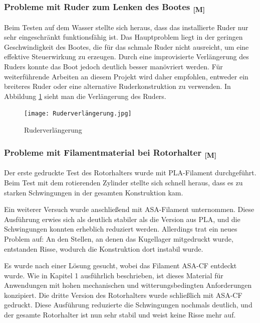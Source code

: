 \documentclass[a4paper,12pt]{article}
\begin{document}
\subsubsection{\texorpdfstring{Probleme mit Ruder zum Lenken des Bootes \textsubscript{[M]}}{Probleme mit Ruder zum Lenken des Bootes [M]}}

Beim Testen auf dem Wasser stellte sich heraus, dass das installierte Ruder nur sehr eingeschränkt funktionsfähig ist. Das Hauptproblem liegt in der geringen Geschwindigkeit des Bootes, die für das schmale Ruder nicht ausreicht, um eine effektive Steuerwirkung zu erzeugen. Durch eine improvisierte Verlängerung des Ruders konnte das Boot jedoch deutlich besser manövriert werden. Für weiterführende Arbeiten an diesem Projekt wird daher empfohlen, entweder ein breiteres Ruder oder eine alternative Ruderkonstruktion zu verwenden. In Abbildung \ref{fig:Ruderverlängerung} sieht man die Verlängerung des Ruders.

\begin{figure}[H]
    \centering
    \texttt{[image: Ruderverlängerung.jpg]}
    \caption{Ruderverlängerung}
    \label{fig:Ruderverlängerung}
\end{figure}

\subsubsection{\texorpdfstring{Probleme mit Filamentmaterial bei Rotorhalter \textsubscript{[M]}}{Probleme mit Filamentmaterial bei Rotorhalter [M]}}

Der erste gedruckte Test des Rotorhalters wurde mit PLA-Filament durchgeführt. Beim Test mit dem rotierenden Zylinder stellte sich schnell heraus, dass es zu starken Schwingungen in der gesamten Konstruktion kam.\newline

Ein weiterer Versuch wurde anschließend mit ASA-Filament unternommen. Diese Ausführung erwies sich als deutlich stabiler als die Version aus PLA, und die Schwingungen konnten erheblich reduziert werden. Allerdings trat ein neues Problem auf: An den Stellen, an denen das Kugellager mitgedruckt wurde, entstanden Risse, wodurch die Konstruktion dort instabil wurde.\newline

Es wurde nach einer Lösung gesucht, wobei das Filament ASA-CF entdeckt wurde. Wie in Kapitel 1 ausführlich beschrieben, ist dieses Material für Anwendungen mit hohen mechanischen und witterungsbedingten Anforderungen konzipiert. Die dritte Version des Rotorhalters wurde schließlich mit ASA-CF gedruckt. Diese Ausführung reduzierte die Schwingungen nochmals deutlich, und der gesamte Rotorhalter ist nun sehr stabil und weist keine Risse mehr auf.
\end{document}
